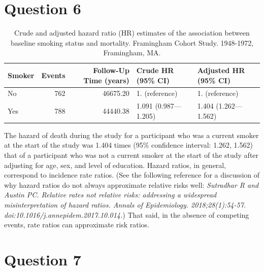 \documentclass{article}\usepackage[]{graphicx}\usepackage[]{color}
\newif\ifdraft  %
\begin{document}
\pagebreak

\section*{Question 6}

\ifdraft

Complete the following table. How would you interpret the parameter estimate that compares smokers to non-smokers in the \textbf{adjusted model}? What measure of association common in epidemiologic research does this correspond to? \textbf{(10 points)}

\fi







\begin{table}[H]
\centering
\parbox{10cm}{\caption{Crude and adjusted hazard ratio (HR) estimates of the association between baseline smoking status and mortality. Framingham Cohort Study. 1948-1972, Framingham, MA.}} 
\begin{tabular}{lrrll}
  \hline
Smoker & Events & Follow-Up Time (years) & Crude HR (95\% CI) & Adjusted HR (95\% CI) \\ 
  \hline
No & 762 & 46675.20 & 1. (reference) & 1. (reference) \\ 
  Yes & 788 & 44440.38 & 1.091 (0.987—1.205) & 1.404 (1.262—1.562) \\ 
   \hline
\end{tabular}
\end{table}


The hazard of death during the study for a participant who was a current smoker at the start of the study was 1.404 times (95\% confidence interval: 1.262, 1.562) that of a participant who was not a current smoker at the start of the study after adjusting for age, sex, and level of education.  Hazard ratios, in general, correspond to incidence rate ratios.  (See the following reference for a discussion of why hazard ratios do not always approximate relative risks well: \textit{Sutradhar R and Austin PC. Relative rates not relative risks: addressing a widespread misinterpretation of hazard ratios. Annals of Epidemiology. 2018;28(1):54-57. doi:10.1016/j.annepidem.2017.10.014.})  That said, in the absence of competing events, rate ratios can approximate risk ratios.

\pagebreak

\section*{Question 7}
\end{document}
